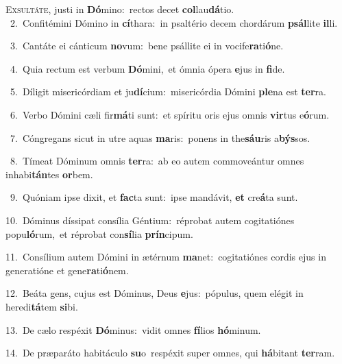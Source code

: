 \lettrine{\initial\textcolor{\initialcolor}{E}}{xsultáte,} justi in \textbf{Dó}\-mino:~\star rectos decet \textbf{col}\-lau\-\textbf{dá}\-tio.\\
{\numbfont\textcolor{\numbcolor}{~2.}}~Confitémini Dómino in \textbf{cí}\-thara:~\star in psaltério decem chordárum \textbf{psál}\-lite \textbf{il}\-li.\par
{\numbfont\textcolor{\numbcolor}{~3.}}~Cantáte ei cánticum \textbf{no}\-vum:~\star bene psállite ei in vocife\-\textbf{ra}\-ti\-\textbf{ó}\-ne.\par
{\numbfont\textcolor{\numbcolor}{~4.}}~Quia rectum est verbum \textbf{Dó}\-mini,~\star et ómnia ópera \textbf{e}\-jus in \textbf{fi}\-de.\par
{\numbfont\textcolor{\numbcolor}{~5.}}~Díligit misericórdiam et ju\-\textbf{dí}\-cium:~\star misericórdia Dómini \textbf{ple}\-na est \textbf{ter}\-ra.\par
{\numbfont\textcolor{\numbcolor}{~6.}}~Verbo Dómini cæli fir\-\textbf{má}\-ti sunt:~\star et spíritu oris ejus omnis \textbf{vir}\-tus e\-\textbf{ó}\-rum.\par
{\numbfont\textcolor{\numbcolor}{~7.}}~Cóngregans sicut in utre aquas \textbf{ma}\-ris:~\star ponens in the\-\textbf{sáu}\-ris a\-\textbf{býs}\-sos.\par
{\numbfont\textcolor{\numbcolor}{~8.}}~Tímeat Dóminum omnis \textbf{ter}\-ra:~\star ab eo autem commoveántur omnes inhabi\-\textbf{tán}\-tes \textbf{or}\-bem.\par
{\numbfont\textcolor{\numbcolor}{~9.}}~Quóniam ipse dixit, et \textbf{fac}\-ta sunt:~\star ipse mandávit, \textbf{et} cre\-\textbf{á}\-ta sunt.\par
{\numbfont\textcolor{\numbcolor}{10.}}~Dóminus díssipat consília Géntium:~\dagger réprobat autem cogitatiónes popu\-\textbf{ló}\-rum,~\star et réprobat con\-\textbf{sí}\-lia \textbf{prín}\-cipum.\par
{\numbfont\textcolor{\numbcolor}{11.}}~Consílium autem Dómini in ætérnum \textbf{ma}\-net:~\star cogitatiónes cordis ejus in generatióne et gene\-\textbf{ra}\-ti\-\textbf{ó}\-nem.\par
{\numbfont\textcolor{\numbcolor}{12.}}~Beáta gens, cujus est Dóminus, Deus \textbf{e}\-jus:~\star pópulus, quem elégit in heredi\-\textbf{tá}\-tem \textbf{si}\-bi.\par
{\numbfont\textcolor{\numbcolor}{13.}}~De cælo respéxit \textbf{Dó}\-minus:~\star vidit omnes \textbf{fí}\-lios \textbf{hó}\-minum.\par
{\numbfont\textcolor{\numbcolor}{14.}}~De præparáto habitáculo \textbf{su}\-o~\star respéxit super omnes, qui \textbf{há}\-bitant \textbf{ter}\-ram.\par
